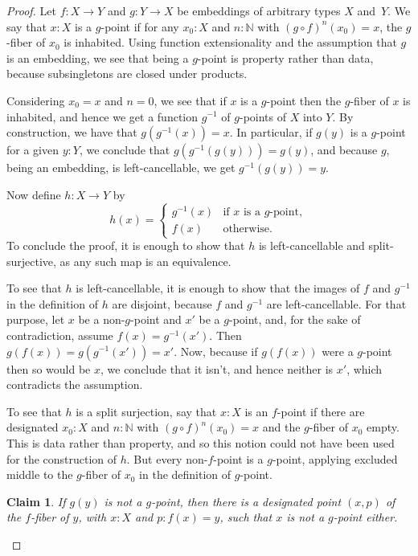 \documentclass{article}
\newtheorem{claim}[theorem]{Claim}
\theoremstyle{definition}
\begin{document}
\begin{proof}
Let $f : X \to Y$ and $g : Y \to X$ be embeddings of arbitrary types $X$ and~$Y$.
%
We say that $x:X$ is a $g$-point if for any $x_0 : X$ and $n : \mathbb{N}$ with $(g \circ f)^n (x_0)=x$, the $g$-fiber of $x_0$ is inhabited. Using function extensionality and the assumption that $g$ is an embedding, we see that being a $g$-point is property rather than data, because subsingletons are closed under products.

Considering $x_0=x$ and $n=0$, we see that if $x$ is a $g$-point then
the $g$-fiber of $x$ is inhabited, and hence we get a function
$g^{-1}$ of $g$-points of $X$ into $Y$. By construction, we have that
$g(g^{-1}(x))=x$. In particular, if $g(y)$ is a $g$-point for a given
$y:Y$, we conclude that $g(g^{-1}(g(y)))=g(y)$, and because $g$, being
an embedding, is left-cancellable, we get $g^{-1}(g(y))=y$.

Now define $h:X \to Y$ by
\[
  h(x) = \begin{cases}
           g^{-1}(x) & \text{if $x$ is a $g$-point}, \\
           f(x) & \text{otherwise.}
         \end{cases}
\]
To conclude the proof, it is enough to show that $h$ is left-cancellable and split-surjective, as any such map is an equivalence.

To see that $h$ is left-cancellable, it is enough to show that the
images of $f$ and $g^{-1}$ in the definition of $h$ are disjoint,
because $f$ and $g^{-1}$ are left-cancellable. For that purpose, let
$x$ be a non-$g$-point and $x'$ be a $g$-point, and, for the sake of
contradiction, assume $f(x) = g^{-1}(x')$. Then
$g(f(x))=g(g^{-1}(x'))=x'$. Now, because if $g(f(x))$ were a $g$-point
then so would be $x$, we conclude that it isn't, and hence neither is
$x'$, which contradicts the assumption.

To see that $h$ is a split surjection, say that $x : X$ is an $f$-point if there are designated $x_0 : X$ and $n : \mathbb{N}$ with $(g \circ f)^n (x_0)=x$ and the $g$-fiber of $x_0$ empty. This is data rather than property, and so this notion could not have been used for the construction of $h$. But every non-$f$-point is a $g$-point, applying excluded middle to the $g$-fiber of $x_0$ in the definition of $g$-point.

\begin{claim}
  If $g(y)$ is not a $g$-point, then there is a designated point
  $(x,p)$ of the $f$-fiber of $y$, with $x : X$ and $p : f(x)=y$,
  such that $x$ is not a $g$-point either.
\end{claim}


\end{proof}
\end{document}
